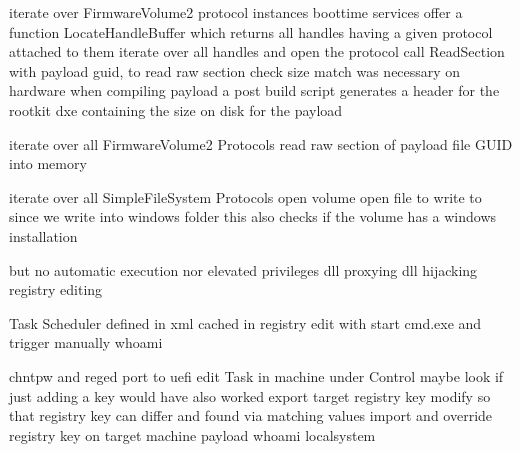 iterate over FirmwareVolume2 protocol instances
boottime services offer a function LocateHandleBuffer which returns all handles having a given protocol attached to them
iterate over all handles and open the protocol
call ReadSection with payload guid, to read raw section
check size match was necessary on hardware
when compiling payload a post build script generates a header for the rootkit dxe containing the size on disk for the payload

iterate over all FirmwareVolume2 Protocols
read raw section of payload file GUID into memory

iterate over all SimpleFileSystem Protocols
open volume
open file to write to
since we write into windows folder this also checks if the volume has a windows installation


but no automatic execution nor elevated privileges
dll proxying
dll hijacking
registry editing

Task Scheduler
defined in xml
cached in registry
edit with start cmd.exe and trigger manually
whoami

chntpw and reged
port to uefi
edit Task in machine under Control
maybe look if just adding a key would have also worked
export target registry key
modify so that registry key can differ and found via matching values
import and override registry key on target machine
payload whoami
localsystem

